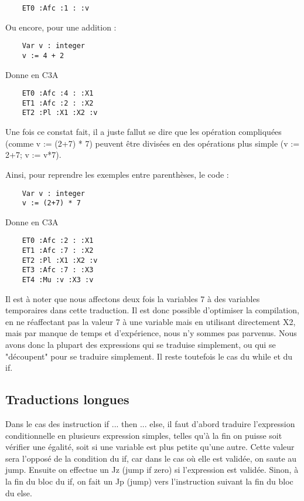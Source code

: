 \documentclass{article}
\begin{document}
\begin{lstlisting}
    ET0 :Afc :1 : :v
\end{lstlisting}

Ou encore, pour une addition :

\begin{lstlisting}
    Var v : integer
    v := 4 + 2
\end{lstlisting}

Donne en C3A

\begin{lstlisting}
    ET0 :Afc :4 : :X1
    ET1 :Afc :2 : :X2
    ET2 :Pl :X1 :X2 :v
\end{lstlisting}

\bigbreak

Une fois ce constat fait, il a juste fallut se dire que les opération compliquées (comme v := (2+7) * 7) peuvent être divisées en des opérations plus simple (v := 2+7; v := v*7).

Ainsi, pour reprendre les exemples entre parenthèses, le code :

\begin{lstlisting}
    Var v : integer
    v := (2+7) * 7
\end{lstlisting}

Donne en C3A

\begin{lstlisting}
    ET0 :Afc :2 : :X1
    ET1 :Afc :7 : :X2
    ET2 :Pl :X1 :X2 :v
    ET3 :Afc :7 : :X3
    ET4 :Mu :v :X3 :v
\end{lstlisting}

Il est à noter que nous affectons deux fois la variables 7 à des variables temporaires dans cette traduction. Il est donc possible d'optimiser la compilation, en ne réaffectant pas la valeur 7 à une variable mais en utilisant directement X2, mais par manque de temps et d'expérience, nous n'y sommes pas parvenus.
\bigbreak
Nous avons donc la plupart des expressions qui se traduise simplement, ou qui se "découpent" pour se traduire simplement. Il reste toutefois le cas du while et du if.


\subsection{Traductions longues}

Dans le cas des instruction if ... then ... else, il faut d'abord traduire l'expression conditionnelle en plusieurs expression simples, telles qu'à la fin on puisse soit vérifier une égalité, soit si une variable est plus petite qu'une autre.
Cette valeur sera l'opposé de la condition du if, car dans le cas où elle est validée, on saute au jump. Ensuite on effectue un Jz (jump if zero) si l'expression est validée.
Sinon, à la fin du bloc du if, on fait un Jp (jump) vers l’instruction suivant la fin du bloc du else.
\end{document}
